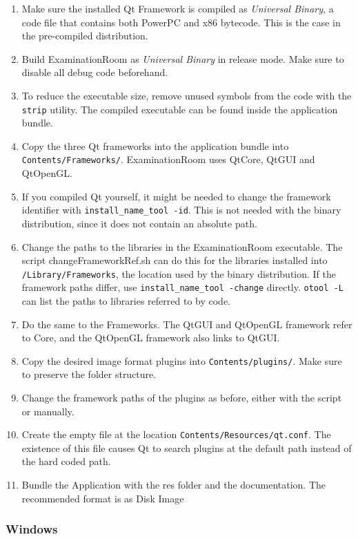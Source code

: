 \begin{enumerate}
\item Make sure the installed Qt Framework is compiled as \textit{Universal Binary}, a code file that contains both PowerPC and x86 bytecode. This is the case in the pre-compiled distribution.
\item Build ExaminationRoom as \textit{Universal Binary} in release mode.
Make sure to disable all debug code beforehand.
\item To reduce the executable size, remove unused symbols from the code with the \texttt{strip} utility.
The compiled executable can be found inside the application bundle.
\item Copy the three Qt frameworks into the application bundle into \texttt{Contents/Frameworks/}.
ExaminationRoom uses QtCore, QtGUI and QtOpenGL.
\item If you compiled Qt yourself, it might be needed to change the framework identifier with \texttt{install\_name\_tool -id}.
This is not needed with the binary distribution, since it does not contain an absolute path.
\item Change the paths to the libraries in the ExaminationRoom executable.
The script changeFrameworkRef.sh can do this for the libraries installed into \texttt{/Library/Frameworks}, the location used by the binary distribution.
If the framework paths differ, use \texttt{install\_name\_tool -change} directly.
\texttt{otool -L} can list the paths to libraries referred to by code.
\item Do the same to the Frameworks.
The QtGUI and QtOpenGL framework refer to Core, and the QtOpenGL framework also links to QtGUI.
\item Copy the desired image format plugins into \texttt{Contents/plugins/}.
Make sure to preserve the folder structure.
\item Change the framework paths of the plugins as before, either with the script or manually.
\item Create the empty file at the location \texttt{Contents/Resources/qt.conf}.
The existence of this file causes Qt to search plugins at the default path instead of the hard coded path.
\item Bundle the Application with the res folder and the documentation. The recommended format is as Disk Image
\end{enumerate}

\subsubsection{Windows}

